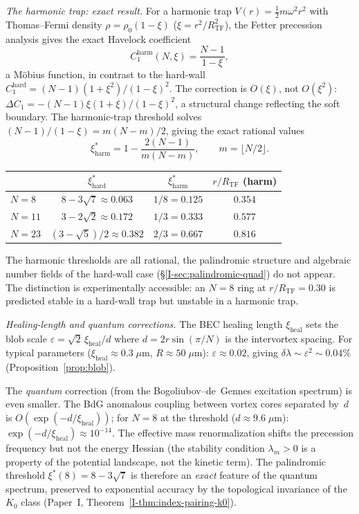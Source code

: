 \emph{The harmonic trap: exact result.}
For a harmonic trap $V(r) = \tfrac{1}{2}m\omega^2 r^2$
with Thomas--Fermi density $\rho = \rho_0(1 - \xi)$
($\xi = r^2/R_{\mathrm{TF}}^2$), the Fetter precession
analysis \citep{Fetter2001} gives the exact Havelock coefficient
\begin{equation}\label{eq:C1-harmonic}
  C_1^{\mathrm{harm}}(N, \xi)
  = \frac{N-1}{1-\xi},
\end{equation}
a M\"obius function, in contrast to the hard-wall
$C_1^{\mathrm{hard}} = (N{-}1)(1{+}\xi^2)/(1{-}\xi)^2$.
The correction is $O(\xi)$, not $O(\xi^2)$:
$\Delta C_1 = -(N{-}1)\xi(1{+}\xi)/(1{-}\xi)^2$,
a structural change reflecting the soft boundary.
The harmonic-trap threshold solves
$(N{-}1)/(1{-}\xi) = m(N{-}m)/2$, giving the exact
rational values
\begin{equation}\label{eq:xi-harm}
  \xi^*_{\mathrm{harm}} = 1 - \frac{2(N-1)}{m(N-m)},
  \qquad m = \lfloor N/2 \rfloor.
\end{equation}
\begin{center}\small
\begin{tabular}{@{}lccc@{}}
\toprule
 & $\xi^*_{\mathrm{hard}}$ & $\xi^*_{\mathrm{harm}}$
 & $r/R_{\mathrm{TF}}$ (harm) \\
\midrule
$N = 8$  & $8{-}3\sqrt{7} \approx 0.063$ & $1/8 = 0.125$  & $0.354$ \\
$N = 11$ & $3{-}2\sqrt{2} \approx 0.172$ & $1/3 = 0.333$  & $0.577$ \\
$N = 23$ & $(3{-}\sqrt{5})/2 \approx 0.382$ & $2/3 = 0.667$  & $0.816$ \\
\bottomrule
\end{tabular}
\end{center}
The harmonic thresholds are all rational, the palindromic
structure and algebraic number fields of the hard-wall case
(\S\ref*{I-sec:palindromic-quad}) do not appear.
The distinction is experimentally accessible: an $N = 8$
ring at $r/R_{\mathrm{TF}} = 0.30$ is predicted stable in
a hard-wall trap but unstable in a harmonic trap.

\emph{Healing-length and quantum corrections.}
The BEC healing length $\xi_{\mathrm{heal}}$ sets the
blob scale $\varepsilon = \sqrt{2}\,\xi_{\mathrm{heal}}/d$
where $d = 2r\sin(\pi/N)$ is the intervortex spacing.
For typical parameters
($\xi_{\mathrm{heal}} \approx 0.3\;\mu\mathrm{m}$,
$R \approx 50\;\mu\mathrm{m}$):
$\varepsilon \approx 0.02$, giving
$\delta\lambda \sim \varepsilon^2 \sim 0.04\%$
(Proposition~\ref{prop:blob}).

The \emph{quantum} correction (from the Bogoliubov--de~Gennes
excitation spectrum) is even smaller.
The BdG anomalous coupling between vortex cores separated
by~$d$ is $O(\exp(-d/\xi_{\mathrm{heal}}))$;
for $N = 8$ at the threshold ($d \approx 9.6\;\mu\mathrm{m}$):
$\exp(-d/\xi_{\mathrm{heal}}) \approx 10^{-14}$.
The effective mass renormalization shifts the precession
frequency but not the energy Hessian (the stability condition
$\lambda_m > 0$ is a property of the potential landscape,
not the kinetic term).
The palindromic threshold $\xi^*(8) = 8{-}3\sqrt{7}$ is
therefore an \emph{exact} feature of the quantum spectrum,
preserved to exponential accuracy by the topological
invariance of the $K_0$ class
(Paper~I, Theorem~\ref{I-thm:index-pairing-k0}).

